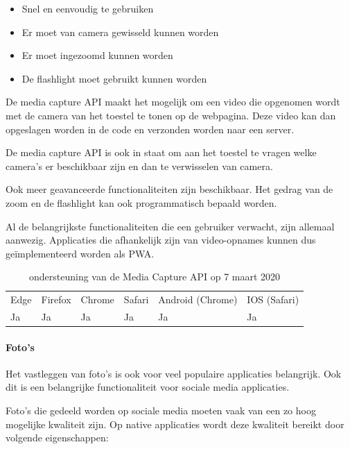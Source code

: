    \begin{itemize}
     \item	Snel en eenvoudig te gebruiken
     \item	Er moet van camera gewisseld kunnen worden
     \item	Er moet ingezoomd kunnen worden
     \item	De flashlight moet gebruikt kunnen worden
   \end{itemize}

De media capture API \autocite{DzungDTran2012}  maakt het mogelijk om een video die opgenomen wordt met de camera van het toestel te tonen op de webpagina. Deze video kan dan opgeslagen worden in de code en verzonden worden naar een server. 

\autocite{Fransson2017}

De media capture API is ook in staat om aan het toestel te vragen welke camera’s er beschikbaar zijn en dan te verwisselen van camera.

\autocite{Scales2020a}

Ook meer geavanceerde functionaliteiten  zijn beschikbaar. Het gedrag van de zoom en de flashlight kan ook programmatisch bepaald worden.

\autocite{Oberhofer2017} \autocite{Ogundipe2018}


Al de belangrijkste functionaliteiten die een gebruiker verwacht, zijn allemaal aanwezig. Applicaties die afhankelijk zijn van video-opnames kunnen dus geïmplementeerd worden als PWA.

\begin{table}[H]
	\centering
	\begin{tabular}{llllll}
		Edge & Firefox & Chrome & Safari & Android (Chrome) & IOS (Safari) \\
		Ja   & Ja      & Ja     & Ja     & Ja               & Ja          
	\end{tabular}	
	\caption{ondersteuning van de Media Capture API op 7 maart 2020}
\end{table}



\paragraph{Foto's }

Het vastleggen van foto's is ook voor veel populaire applicaties belangrijk. Ook dit is een belangrijke functionaliteit voor sociale media applicaties.

Foto's die gedeeld worden op sociale media moeten vaak van een zo hoog mogelijke kwaliteit zijn. Op native applicaties wordt deze kwaliteit bereikt door volgende eigenschappen: 

